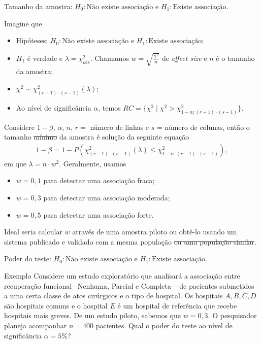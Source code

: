 \documentclass[9pt]{beamer}
\begin{document}
\begin{frame}{Tamanho da amostra: $H_0:\mbox{Não existe associação}$ e $H_1:\mbox{Existe associação} $.}

Imagine que
\begin{itemize}
	\item Hipóteses: $H_0:\mbox{Não existe associação}$ e $H_1:\mbox{Existe associação} $;
	\item $H_1$ é verdade e $\lambda = \chi^2_{obs}$. Chamamos $w = \sqrt{\frac{\chi^2}{n}}$ de \textit{effect size} e $n$ é o tamanho da amostra;
	\item $\chi^2  \sim \chi^2_{(r-1)\cdot (s-1)}\left( \lambda \right)$;
	\item Ao nível de significância $\alpha$, temos $RC = \{ \chi^2 \mid \chi^2 > \chi^2_{1-\alpha; (r-1) \cdot (s-1)}  \}$.
\end{itemize}
\vfill

Considere $1-\beta$, $\alpha$, $n$, $r = $ número de linhas e $s$ = número de colunas, então o tamanho \sout{mínimo} da amostra é solução da seguinte equação
\begin{align*}
1-\beta = 1 - P\left( \chi_{(r-1)\cdot (s-1)}^2(\lambda) \leq \chi_{1-\alpha; (r-1)\cdot (s-1)}^2 \right),
\end{align*}
em que $\lambda = n \cdot w^2$. Geralmente, usamos
\begin{itemize}
	\item $w=0,1$ para detectar uma associação fraca;
	\item $w=0,3$ para detectar uma associação moderada;
	\item $w=0,5$ para detectar uma associação forte.
\end{itemize}
Ideal seria calcular $w$ através de uma amostra piloto ou obtê-lo usando um sistema publicado e validado com a mesma população \sout{ou uma população similar}.
\end{frame}

\begin{frame}{Poder do teste: $H_0:\mbox{Não existe associação}$ e $H_1:\mbox{Existe associação} $.}

\large
\begin{block}{Exemplo}
	Considere um estudo exploratório que analisará a associação entre recuperação funcional-- Nenhuma, Parcial e Completa -- de pacientes submetidos a uma certa classe de atos cirúrgicos e o tipo de hospital. Os hospitais $A, B, C, D$ são hospitais comuns e o hospital $E$ é um hospital de referência que recebe hospitais mais greves. De um estudo piloto, sabemos que $w= 0,3$. O pesquisador planeja acompanhar $n=400$ pacientes. Qual o poder do teste ao nível de significância $\alpha=5\%$?
\end{block}
\normalsize

\end{frame}
\end{document}
